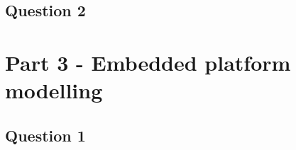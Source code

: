 \documentclass[12pt]{article} %
\begin{document}
\subsection{Question 2} %



\section{Part 3 - Embedded platform modelling}

\subsection{Question 1}
\end{document}
